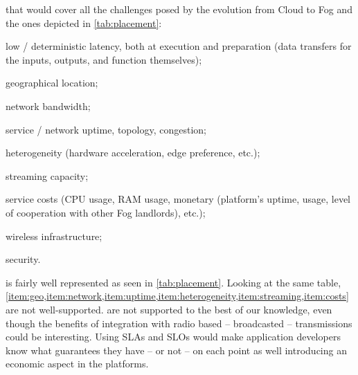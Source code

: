 \documentclass[11pt]{sdm}
\begin{document}
\begin{description}[leftmargin=10pt]
	\item[Lack of \acrfullpl{SLA}] that would cover all the challenges posed by the evolution from Cloud to Fog \cite{chiang_fog_2016, bonomi_fog_2012} and the ones depicted in \cref{tab:placement}:
		\begin{enumerate*}[(1)]
			\item \label{item:latency} low / deterministic latency, both at execution and preparation (data transfers for the inputs, outputs, and function themselves);
			\item \label{item:geo} geographical location;
			\item \label{item:network} network bandwidth;
			\item \label{item:uptime} service / network uptime, topology, congestion;
			\item \label{item:heterogeneity} heterogeneity (hardware acceleration, edge preference, etc.);
			\item \label{item:streaming} streaming capacity;
			\item \label{item:costs} service costs (CPU usage, RAM usage, monetary (platform's uptime, usage, level of cooperation with other Fog landlords), etc.);
			\item \label{item:wireless} wireless infrastructure;
			\item \label{item:security} security.
		\end{enumerate*}
		 is fairly well represented as seen in \cref{tab:placement}. Looking at the same table, \cref{item:geo,item:network,item:uptime,item:heterogeneity,item:streaming,item:costs} are not well-supported.  are not supported to the best of our knowledge, even though the benefits of integration with radio based -- broadcasted -- transmissions could be interesting. Using \glspl{SLA} and \glspl{SLO} would make application developers know what guarantees they have -- or not -- on each point as well introducing an economic aspect in the platforms.


\end{description}
\end{document}
